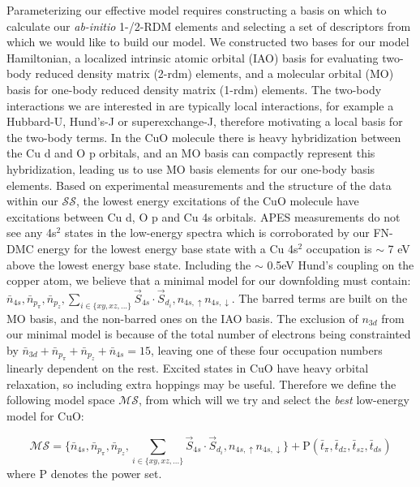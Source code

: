 \documentclass{article}
\begin{document}
Parameterizing our effective model requires constructing a basis on which to calculate our \textit{ab-initio} 1-/2-RDM elements and selecting a set of descriptors from which we would like to build our model. We constructed two bases for our model Hamiltonian, a localized intrinsic atomic orbital (IAO) basis for evaluating two-body reduced density matrix (2-rdm) elements, and a molecular orbital (MO) basis for one-body reduced density matrix (1-rdm) elements. The two-body interactions we are interested in are typically local interactions, for example a Hubbard-U, Hund's-J or superexchange-J, therefore motivating a local basis for the two-body terms. In the CuO molecule there is heavy hybridization between the Cu d and O p orbitals, and an MO basis can compactly represent this hybridization, leading us to use MO basis elements for our one-body basis elements. Based on experimental measurements and the structure of the data within our $\mathcal{SS}$, the lowest energy excitations of the CuO molecule have excitations between Cu d, O p and Cu 4s orbitals. APES measurements do not see any 4s$^2$ states in the low-energy spectra which is corroborated by our FN-DMC energy for the lowest energy base state with a Cu 4s$^2$ occupation is $\sim$ 7 eV above the lowest energy base state. Including the $\sim$ 0.5eV Hund's coupling on the copper atom, we believe that a minimal model for our downfolding must contain: $\bar{n}_{4s}, \bar{n}_{p_\pi}, \bar{n}_{p_z}, \sum_{i \in \{xy, xz, ...\}}\vec{S}_{4s}\cdot \vec{S}_{d_i}, n_{4s, \uparrow} n_{4s,\downarrow}$. The barred terms are built on the MO basis, and the non-barred ones on the IAO basis. The exclusion of $n_{3d}$ from our minimal model is because of the total number of electrons being constrainted by $\bar{n}_{3d} + \bar{n}_{p_\pi} + \bar{n}_{p_z} + \bar{n}_{4s} = 15$, leaving one of these four occupation numbers linearly dependent on the rest. Excited states in CuO have heavy orbital relaxation, so including extra hoppings may be useful. Therefore we define the following model space $\mathcal{MS}$, from which will we try and select the \textit{best} low-energy model for CuO: 

\begin{equation}
\mathcal{MS} = \{\bar{n}_{4s}, \bar{n}_{p_\pi}, \bar{n}_{p_z}, \sum_{i \in \{xy, xz, ...\}}\vec{S}_{4s}\cdot \vec{S}_{d_i}, n_{4s, \uparrow} n_{4s,\downarrow}\} + \text{P}(\bar{t}_\pi, \bar{t}_{dz}, \bar{t}_{sz}, \bar{t}_{ds})
\end{equation}
where P denotes the power set.
\end{document}
